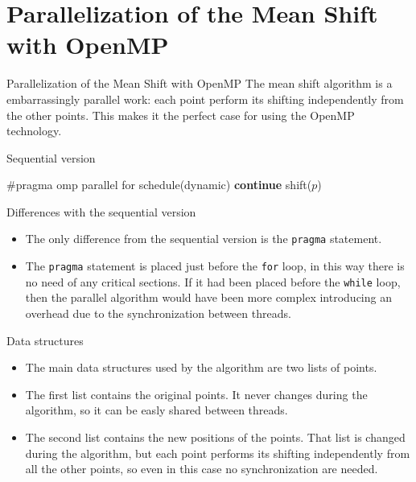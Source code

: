 \documentclass{beamer}
\begin{document}
\section{Parallelization of the Mean Shift with OpenMP}


\begin{frame}{Parallelization of the Mean Shift with OpenMP}
The mean shift algorithm is a embarrassingly parallel work: each point perform its shifting independently from the other points. This makes it the perfect case for using the OpenMP technology.
\end{frame}


\begin{frame}{Sequential version}

\begin{algorithm}[H]
\caption{Mean shift core parallel}
\begin{algorithmic}[1]

        \State \#pragma omp parallel for schedule(dynamic)
                    \State \textbf{continue}
                \EndIf
            \State shift($p$)
            \EndFor
    \EndWhile

\end{algorithmic}
\end{algorithm}

\end{frame}


\begin{frame}[fragile]{Differences with the sequential version}

\begin{itemize}
\item
The only difference from the sequential version is the \verb"pragma" statement.
\item
The \verb"pragma" statement is placed just before the \verb"for" loop, in this way there is no need of any critical sections. If it had been placed before the \verb"while" loop, then the parallel algorithm would have been more complex introducing an overhead due to the synchronization between threads.
\end{itemize}

\end{frame}


\begin{frame}{Data structures}

\begin{itemize}
\item
The main data structures used by the algorithm are two lists of points.
\item
The first list contains the original points. It never changes during the algorithm, so it can be easly shared between threads.
\item
The second list contains the new positions of the points. That list is changed during the algorithm, but each point performs its shifting independently from all the other points, so even in this case no synchronization are needed.
\end{itemize}
\end{frame}
\end{document}
